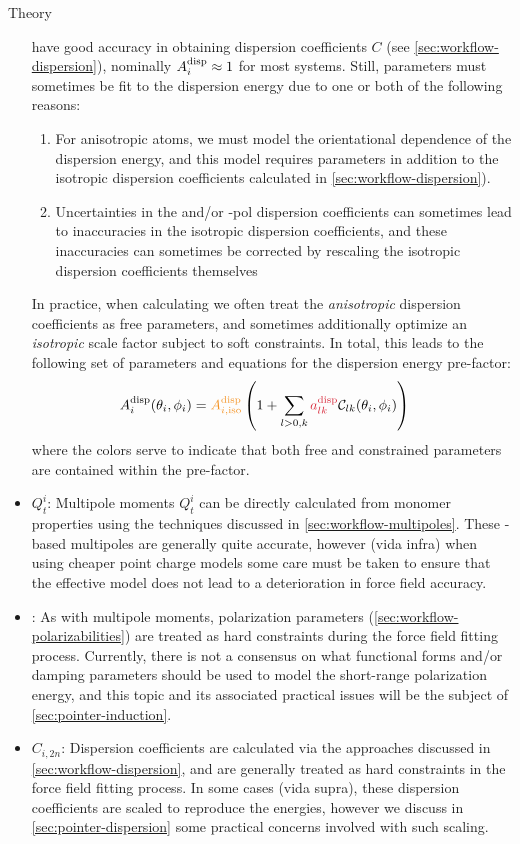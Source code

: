 \begin{subsection}{Theory}
\begin{itemize}
have good accuracy in obtaining dispersion coefficients $C$ (see
\cref{sec:workflow-dispersion}),
nominally $A^{\text{disp}}_{i} \approx 1$ for most systems. Still, parameters must
sometimes be fit to the dispersion energy due to one or both of the following reasons: 
    \begin{enumerate}
    \item For anisotropic atoms, we must model the orientational dependence of
    the dispersion energy, and this model requires parameters in addition to
    the isotropic dispersion coefficients calculated in
    \cref{sec:workflow-dispersion}).
    \item Uncertainties in the \idma and/or \isa-pol dispersion coefficients can
    sometimes lead to inaccuracies in the isotropic dispersion coefficients,
    and these inaccuracies can sometimes be corrected by rescaling
    the isotropic dispersion coefficients themselves
    \end{enumerate}
In practice, when calculating  we often treat the \emph{anisotropic}
dispersion coefficients \adisp as free parameters, and sometimes additionally
optimize an \emph{isotropic} scale factor subject to
soft constraints.\footnotemark{ }
In total, this leads to the following set of parameters and equations for the
dispersion energy pre-factor:
%
\begin{align}
\Adisp{i}(\theta_i,\phi_i) &=
\textcolor{cfit}{\Adisp{i,\text{iso}}}
\left(1 + 
\sum\limits_{l>0,k} \textcolor{fit}{\adisp}  \mathcal{C}_{lk}(\theta_i,\phi_i)
\right)
\end{align}
where the colors serve to indicate that both free and constrained
parameters are contained within the pre-factor.
%
\item \textcolor{mon}{$Q^i_t$}:
Multipole moments $Q^i_t$ can be directly calculated from monomer properties
using the techniques discussed in \cref{sec:workflow-multipoles}. These
\isa-based multipoles are generally quite accurate, however (vida infra) when
using cheaper point charge models some care must be taken to ensure that the
effective model does not lead to a deterioration in force field accuracy.
\item \textcolor{mon}{\vdrude}:
As with multipole moments, polarization parameters
(\cref{sec:workflow-polarizabilities}) are treated as hard
constraints during the force field fitting process. Currently, there is not a
consensus on what functional forms and/or damping parameters should be used to 
model the short-range polarization energy, and this topic and its associated
practical issues will be the subject of \cref{sec:pointer-induction}.
\item \textcolor{mon}{$C_{i,2n}$}:
Dispersion coefficients are calculated via the approaches discussed in
\cref{sec:workflow-dispersion}, and are generally treated as hard constraints in the
force field fitting process. In some cases (vida supra), these dispersion
coefficients are scaled to reproduce the \sapt energies, however we discuss in
\cref{sec:pointer-dispersion} some practical concerns involved with such
scaling.
\end{itemize}



\end{subsection}
